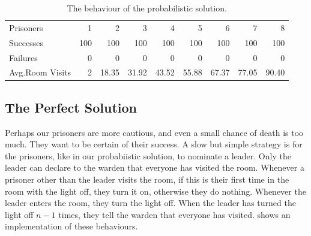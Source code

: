 \begin{table}
  \centering
  \begin{tabular}{lrrrrrrrr} \toprule
    Prisoners          &   1 &   2    &   3    &   4    &   5    &   6    &   7    &   8 \\
    Successes          & 100 & 100    & 100    & 100    & 100    & 100    & 100    & 100 \\
    Failures           &   0 &   0    &   0    &   0    &   0    &   0    &   0    &   0 \\
    Avg.\@ Room Visits &   2 &  18.35 &  31.92 &  43.52 &  55.88 &  67.37 &  77.05 &  90.40 \\ \bottomrule
  \end{tabular}
  \caption{The behaviour of the probabilistic solution.}\label{tbl:100rand}
\end{table}

\subsection{The Perfect Solution}

Perhaps our prisoners are more cautious, and even a small chance of
death is too much.  They want to be certain of their success.  A slow
but simple strategy is for the prisoners, like in our probabiistic
solution, to nominate a leader.  Only the leader can declare to the
warden that everyone has visited the room.  Whenever a prisoner other
than the leader visits the room, if this is their first time in the
room with the light off, they turn it on, otherwise they do nothing.
Whenever the leader enters the room, they turn the light off.  When
the leader has turned the light off $n-1$ times, they tell the warden
that everyone has visited.   shows an
implementation of these behaviours.

